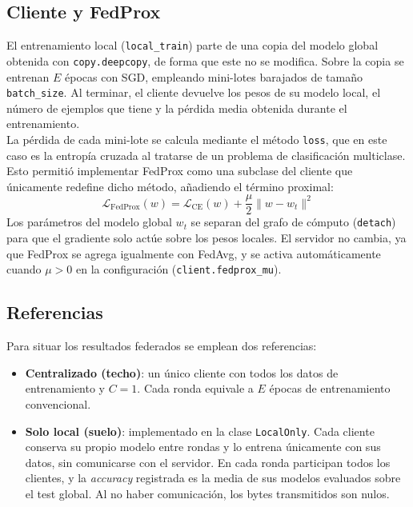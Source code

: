 \subsection{Cliente y FedProx}
El entrenamiento local (\texttt{local\_train}) parte de una copia del modelo global obtenida con
\texttt{copy.deepcopy}, de forma que este no se modifica. Sobre la copia se entrenan $E$ épocas con SGD, empleando
mini-lotes barajados de tamaño \texttt{batch\_size}. Al terminar, el cliente devuelve los pesos de su modelo local,
el número de ejemplos que tiene y la pérdida media obtenida durante el entrenamiento.
\\

La pérdida de cada mini-lote se calcula mediante el método \texttt{loss}, que en este caso es la entropía cruzada
al tratarse de un problema de clasificación multiclase. Esto permitió implementar FedProx como una subclase del cliente 
que únicamente redefine dicho método, añadiendo el término proximal:
\[
\mathcal{L}_{\text{FedProx}}(w) = \mathcal{L}_{\text{CE}}(w) + \frac{\mu}{2} \lVert w - w_t \rVert^2
\]
Los parámetros del modelo global $w_t$ se separan del grafo de cómputo (\texttt{detach}) para que el gradiente
solo actúe sobre los pesos locales. El servidor no cambia, ya que FedProx se agrega igualmente con FedAvg, y se
activa automáticamente cuando $\mu > 0$ en la configuración (\texttt{client.fedprox\_mu}).

\subsection{Referencias}
Para situar los resultados federados se emplean dos referencias:

\begin{itemize}
    \item \textbf{Centralizado (techo)}: un único cliente con todos los datos de entrenamiento y $C=1$. Cada
    ronda equivale a $E$ épocas de entrenamiento convencional.
    \item \textbf{Solo local (suelo)}: implementado en la clase \texttt{LocalOnly}. Cada cliente conserva su propio
    modelo entre rondas y lo entrena únicamente con sus datos, sin comunicarse con el servidor. En cada ronda
    participan todos los clientes, y la \textit{accuracy} registrada es la media de sus modelos evaluados sobre el
    test global. Al no haber comunicación, los bytes transmitidos son nulos.
\end{itemize}
